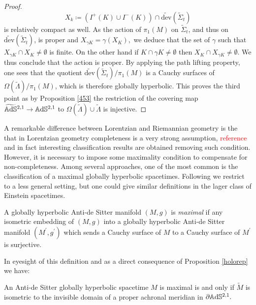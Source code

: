 \begin{proof}
    \[
        X_k\coloneqq (I^+(K)\cup I^-(K))\cap \widetilde{\text{dev}}(\widetilde{\Sigma}_t) 
    \]   
    is relatively compact as well. As the action of $\pi_1(M)$ on $\widetilde{\Sigma}_t$, and thus on $\widetilde{\text{dev}}(\widetilde{\Sigma}_t)$, is proper and $X_{\gamma K}=\gamma(X_K),$ we deduce that the set of $\gamma$ such that $X_{\gamma K}\cap X_K\neq\emptyset$ is finite. On the other hand if $K\cap \gamma K\neq\emptyset$ then $X_K\cap X_{\gamma K}\neq \emptyset.$ We thus conclude that the action is proper. By applying the path lifting property, one sees that the quotient $\widetilde{\text{dev}}(\widetilde{\Sigma}_t)/\pi_1(M)$ is a Cauchy surfaces of $\Omega(\widetilde{\Lambda})/\pi_1(M)$, which is therefore globally hyperbolic. This proves the third point as by Proposition \ref{453} the restriction of the covering map $\widetilde{\mathbb{A}\mathrm{d}\mathbb{S}}{}^{2,1}\to \mathbb{A}\mathrm{d}\mathbb{S}^{2,1}$ to $\Omega(\widetilde{\Lambda})\cup \widetilde{\Lambda}$ is injective. 
\end{proof}

A remarkable difference between Lorentzian and Riemannian geometry is the that in Lorentzian geometry completeness is a very strong assumption, \textcolor{red}{reference} and in fact interesting classification results are obtained removing such condition. However, it is necessary to impose some maximality condition to compensate for non-completeness. Among several  approaches, one of the most common is the classification of a maximal globally hyperbolic spacetimes. Following \cite{bonsanteseppi} we restrict to a less general setting, but one could give similar definitions in the lager class of Einstein spacetimes.

\begin{definition}
    A globally hyperbolic Anti-de Sitter manifold $(M,g)$ is \textit{maximal} if any isometric embedding of $(M,g)$ into a globally hyperbolic Anti-de Sitter manifold $(M^{\prime},g^{\prime})$ which sends a Cauchy surface of $M$ to a Cauchy surface of $M^{\prime}$ is surjective.
\end{definition}

In eyesight of this definition and as a direct consequence of Proposition \ref{holorep} we have:

\begin{corollary}
An Anti-de Sitter globally hyperbolic spacetime $M$ is maximal is and only if $\widetilde{M}$ is isometric to the invisible domain of a proper achronal meridian in $\partial\mathbb{A}\mathrm{d}\mathbb{S}^{2,1}.$
\end{corollary}


